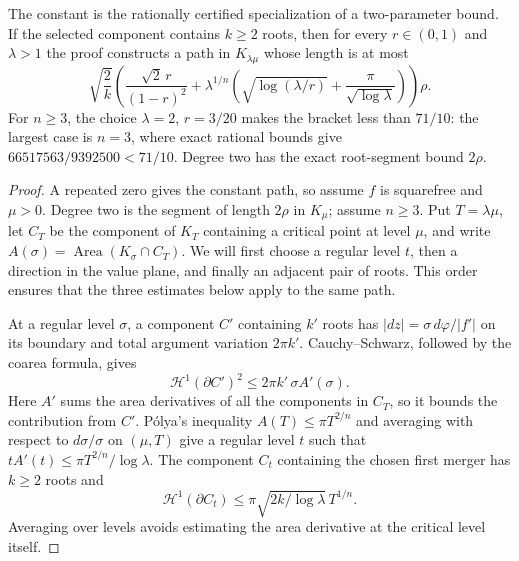\documentclass[11pt]{article}
\begin{document}
The constant is the rationally certified specialization of a two-parameter
bound.  If the selected component contains $k\ge2$ roots, then for
every $r\in(0,1)$ and $\lambda>1$ the proof constructs a path in
$K_{\lambda\mu}$ whose length is at most
\[
 \sqrt{\frac2k}\left(
   \frac{\sqrt2\,r}{(1-r)^2}
   +\lambda^{1/n}\left(
      \sqrt{\log(\lambda/r)}+
      \frac{\pi}{\sqrt{\log\lambda}}
    \right)
 \right)\rho.                                      \tag{CF}
\]
For $n\ge3$, the choice $\lambda=2$, $r=3/20$ makes the bracket less
than $71/10$: the largest case is $n=3$, where exact rational bounds give
$66517563/9392500<71/10$.  Degree two has the exact root-segment bound
$2\rho$.

\begin{proof}
A repeated zero gives the constant path, so assume $f$ is squarefree and
$\mu>0$. Degree two is the segment of length $2\rho$ in $K_\mu$; assume
$n\ge3$. Put $T=\lambda\mu$, let $C_T$ be the component of $K_T$
containing a critical point at level $\mu$, and write
$A(\sigma)=\operatorname{Area}(K_\sigma\cap C_T)$.
We will first choose a regular level $t$, then a direction in the value
plane, and finally an adjacent pair of roots. This order ensures that
the three estimates below apply to the same path.

At a regular level $\sigma$, a component $C'$ containing $k'$ roots has
$|dz|=\sigma\,d\varphi/|f'|$ on its boundary and total argument variation
$2\pi k'$. Cauchy--Schwarz, followed by the coarea formula, gives
\[
 \mathcal H^1(\partial C')^2\le2\pi k'\,\sigma A'(\sigma).
                                                        \tag{CF1}
\]
Here $A'$ sums the area derivatives of all the components in $C_T$,
so it bounds the contribution from $C'$. P\'olya's inequality
$A(T)\le\pi T^{2/n}$ \cite[Theorem~1]{crane} and averaging with respect
to $d\sigma/\sigma$ on $(\mu,T)$ give a regular level $t$ such that
$tA'(t)\le\pi T^{2/n}/\log\lambda$. The component $C_t$ containing
the chosen first merger has $k\ge2$ roots and
\[
 \mathcal H^1(\partial C_t)
 \le\pi\sqrt{2k/\log\lambda}\,T^{1/n}.
\]
Averaging over levels avoids estimating the area derivative at the
critical level itself.


\end{proof}
\end{document}
